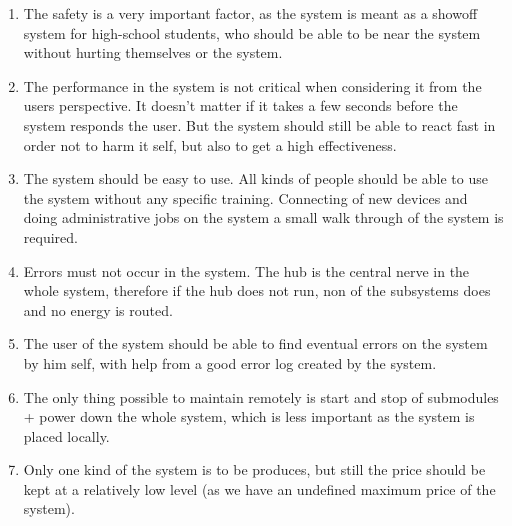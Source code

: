\begin{enumerate}
	\item The safety is a very important factor, as the system is meant as a showoff system for high-school students, who should be able to be near the system without hurting themselves or the system.
	\item The performance in the system is not critical when considering it from the users perspective. It doesn't matter if it takes a few seconds before the system responds the user. But the system should still be able to react fast in order not to harm it self, but also to get a high effectiveness. 
	\item The system should be easy to use. All kinds of people should be able to use the system without any specific training. Connecting of new devices and doing administrative jobs on the system a small walk through of the system is required. 
	\item Errors must not occur in the system. The hub is the central nerve in the whole system, therefore if the hub does not run, non of the subsystems does and no energy is routed.
	\item The user of the system should be able to find eventual errors on the system by him self, with help from a good error log created by the system.
	\item The only thing possible to maintain remotely is start and stop of submodules + power down the whole system, which is less important as the system is placed locally.
	\item Only one kind of the system is to be produces, but still the price should be kept at a relatively low level (as we have an undefined maximum price of the system).
\end{enumerate}

